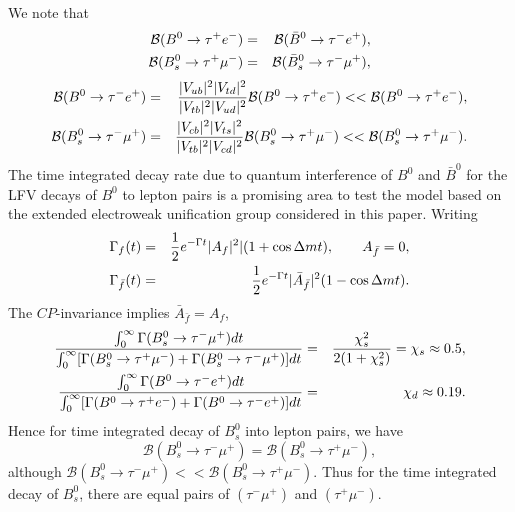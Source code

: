 \documentclass{ws-ijmpa}
\begin{document}
We note that
\begin{eqnarray}
\mathcal{B}(B^{0}\rightarrow \tau^{+}e^{-})  &=& \mathcal{B}(\bar{B}^{0}\rightarrow \tau^{-}e^{+})\notag ,\\
 \mathcal{B}(B^{0}_{s}\rightarrow \tau^{+}\mu^{-})  &=& \mathcal{B}(\bar{B}^{0}_{s}\rightarrow \tau^{-}\mu^{+})\label{33},
\end{eqnarray}
\begin{eqnarray}
\mathcal{B}(B^{0}\rightarrow \tau^{-}e^{+})  &=& \frac{|V_{ub}|^2|V_{td}|^2}{|V_{tb}|^2|V_{ud}|^2}\mathcal{B}(B^{0}\rightarrow \tau^{+}e^{-}) <<  \mathcal{B}(B^{0}\rightarrow \tau^{+}e^{-})\notag ,\\
\mathcal{B}(B^{0}_{s}\rightarrow \tau^{-}\mu^{+})  &=& \frac{|V_{cb}|^2|V_{ts}|^2}{|V_{tb}|^2|V_{cd}|^2}\mathcal{B}(B^{0}_{s}\rightarrow \tau^{+}\mu^{-}) <<  \mathcal{B}(B^{0}_{s}\rightarrow \tau^{+}\mu^{-})\label{34}.
\end{eqnarray}
The time integrated decay rate due to quantum interference of $B^{0}$ and $\bar{B}^{0}$ for the LFV decays of $B^{0}$ to lepton pairs is a promising area to test the model based on the extended electroweak unification group considered in this paper. Writing
\begin{eqnarray}
\Gamma_{f}(t)&=&{1\over2}e^{-\Gamma
t}|A_{f}|^2|(1+\cos\Delta mt), \quad\quad A_{\bar{f}}=0\notag,\\
\Gamma_{\bar f}(t)&=&{1\over2}e^{-\Gamma
t}|\bar{A}_{\bar{f}}|^2(1-\cos\Delta mt)\notag.
\end{eqnarray}
The $CP$-invariance implies $\bar{A}_{\bar{f}} = A_{f}$,
\begin{eqnarray}
\frac{\int^{\infty}_{0}\Gamma(B^{0}_{s}\rightarrow \tau^{-}\mu^{+})dt}{\int^{\infty}_{0}[\Gamma(B^{0}_{s}\rightarrow \tau^{+}\mu^{-})+\Gamma(B^{0}_{s}\rightarrow \tau^{-}\mu^{+})]dt} &=& \frac{\chi^2_s}{2(1+\chi^{2}_s)} = \chi_{s} \approx 0.5\notag ,\\
\frac{\int^{\infty}_{0}\Gamma(B^{0}\rightarrow \tau^{-}e^{+})dt}{\int^{\infty}_{0}[\Gamma(B^{0}\rightarrow \tau^{+}e^{-})+\Gamma(B^{0}\rightarrow \tau^{-}e^{+})]dt} &=& \chi_{d} \approx 0.19\label{35}.
\end{eqnarray}
Hence for time integrated decay of  $B_{s}^{0}$ into lepton pairs, we have
\begin{equation}
\mathcal{B}(B^{0}_{s}\rightarrow \tau^{-}\mu^{+}) = \mathcal{B}(B^{0}_{s}\rightarrow \tau^{+}\mu^{-}),
\end{equation}
although $\mathcal{B}(B^{0}_{s}\rightarrow \tau^{-}\mu^{+}) << \mathcal{B}(B^{0}_{s}\rightarrow \tau^{+}\mu^{-})$.
Thus for the time integrated decay of $B_{s}^{0}$, there are equal pairs of $(\tau^{-}\mu^{+})$ and $(\tau^{+}\mu^{-})$. 
\end{document}
